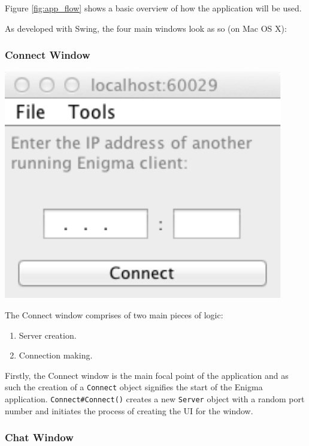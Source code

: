     Figure \ref{fig:app_flow} shows a basic overview of how the application will be used.
    
    As developed with Swing, the four main windows look as so (on Mac OS X):
    
    \subsubsection{Connect Window}
    
    \begin{center}
      \includegraphics[scale=0.7]{./Figures/Ch6/6-3-1-2-connect_window.pdf}
    \end{center}
    
    The Connect window comprises of two main pieces of logic:
    
    \begin{enumerate}
      \item Server creation.
      \item Connection making.
    \end{enumerate}
    
    Firstly, the Connect window is the main focal point of the application and as such the creation of a \verb!Connect! object signifies the start of the Enigma application. \verb!Connect#Connect()! creates a new \verb!Server! object with a random port number and initiates the process of creating the UI for the window.
    
    
  
    \subsubsection{Chat Window}
    
